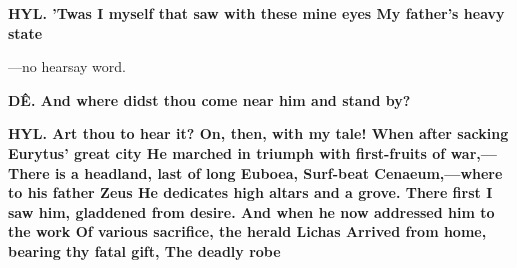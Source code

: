 \documentclass[11pt,letter]{book}
\begin{document}
\par \textbf{HYL. ’Twas I myself that saw with these mine eyes My father’s heavy state}
\par  —no hearsay word.

\par \textbf{DÊ. And where didst thou come near him and stand by?}
\par 

\par \textbf{HYL. Art thou to hear it? On, then, with my tale! When after sacking Eurytus’ great city He marched in triumph with first-fruits of war,— There is a headland, last of long Euboea, Surf-beat Cenaeum,—where to his father Zeus He dedicates high altars and a grove. There first I saw him, gladdened from desire. And when he now addressed him to the work Of various sacrifice, the herald Lichas Arrived from home, bearing thy fatal gift, The deadly robe}
\end{document}

